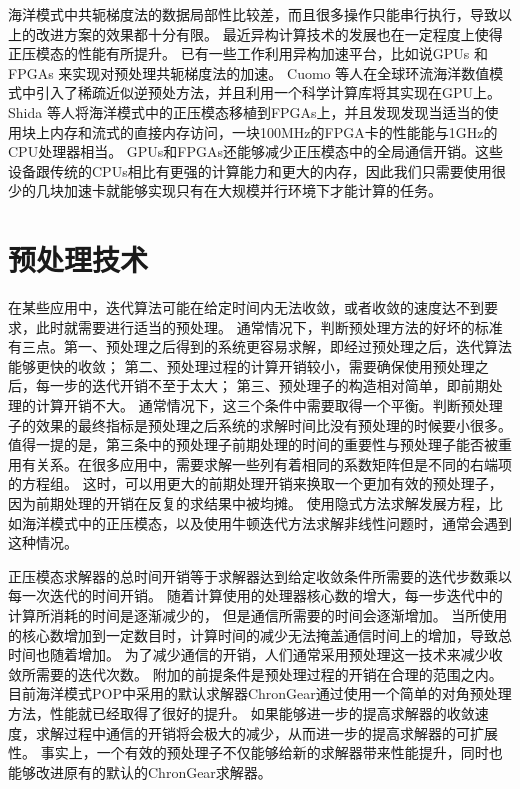  

海洋模式中共轭梯度法的数据局部性比较差，而且很多操作只能串行执行，导致以上的改进方案的效果都十分有限。
最近异构计算技术的发展也在一定程度上使得正压模态的性能有所提升。 
已有一些工作利用异构加速平台，比如说GPUs \cite{cuomo2012pcg} 和FPGAs \cite{Shida2007}来实现对预处理共轭梯度法的加速。 
Cuomo 等人\cite{cuomo2012pcg}在全球环流海洋数值模式中引入了稀疏近似逆预处方法，并且利用一个科学计算库将其实现在GPU上。 
Shida 等人\cite{Shida2007}将海洋模式中的正压模态移植到FPGAs上，并且发现发现当适当的使用块上内存和流式的直接内存访问，一块100MHz的FPGA卡的性能能与1GHz的CPU处理器相当。 
GPUs和FPGAs还能够减少正压模态中的全局通信开销。这些设备跟传统的CPUs相比有更强的计算能力和更大的内存，因此我们只需要使用很少的几块加速卡就能够实现只有在大规模并行环境下才能计算的任务。 


\section{预处理技术}
\label{related:precond}
在某些应用中，迭代算法可能在给定时间内无法收敛，或者收敛的速度达不到要求，此时就需要进行适当的预处理。
通常情况下，判断预处理方法的好坏的标准有三点。第一、预处理之后得到的系统更容易求解，即经过预处理之后，迭代算法能够更快的收敛； 第二、预处理过程的计算开销较小，需要确保使用预处理之后，每一步的迭代开销不至于太大； 第三、预处理子的构造相对简单，即前期处理的计算开销不大。 
通常情况下，这三个条件中需要取得一个平衡。判断预处理子的效果的最终指标是预处理之后系统的求解时间比没有预处理的时候要小很多。 
值得一提的是，第三条中的预处理子前期处理的时间的重要性与预处理子能否被重用有关系。在很多应用中，需要求解一些列有着相同的系数矩阵但是不同的右端项的方程组。
这时，可以用更大的前期处理开销来换取一个更加有效的预处理子，因为前期处理的开销在反复的求结果中被均摊。 
使用隐式方法求解发展方程，比如海洋模式中的正压模态，以及使用牛顿迭代方法求解非线性问题时，通常会遇到这种情况\cite{benzi2002preconditioning}。

正压模态求解器的总时间开销等于求解器达到给定收敛条件所需要的迭代步数乘以每一次迭代的时间开销。
随着计算使用的处理器核心数的增大，每一步迭代中的计算所消耗的时间是逐渐减少的，
但是通信所需要的时间会逐渐增加。 
当所使用的核心数增加到一定数目时，计算时间的减少无法掩盖通信时间上的增加，导致总时间也随着增加。 
为了减少通信的开销，人们通常采用预处理这一技术来减少收敛所需要的迭代次数。
附加的前提条件是预处理过程的开销在合理的范围之内。 
目前海洋模式POP中采用的默认求解器ChronGear通过使用一个简单的对角预处理方法，性能就已经取得了很好的提升\cite{pini1990simple, reddy2013comparison}。 
如果能够进一步的提高求解器的收敛速度，求解过程中通信的开销将会极大的减少，从而进一步的提高求解器的可扩展性。
事实上，一个有效的预处理子不仅能够给新的求解器带来性能提升，同时也能够改进原有的默认的ChronGear求解器。


